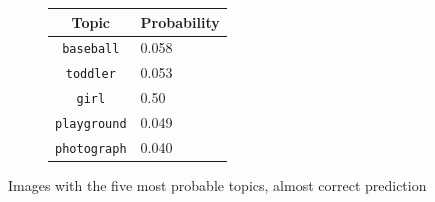 \documentclass[twoside,twocolumn]{article}
\begin{document}
\begin{figure}
\begin{subfigure}{\textwidth}
			\begin{minipage}[t]{.5\textwidth}
				\centering
				\vspace{0pt}
				\begin{tabular}{cl}
					Topic                           & Probability\\
					\hline
					\texttt{baseball}             & 0.058 \\
					\texttt{toddler}                   & 0.053 \\
					\texttt{girl}                 & 0.50 \\
					\texttt{playground}           & 0.049 \\
					\texttt{photograph}        & 0.040\\
					\hline
				\end{tabular}
			\end{minipage}
		\end{subfigure}
		\caption{Images with the five most probable topics, almost correct prediction}
		\label{fig:predsemi}
	\end{figure}
	
\end{document}
